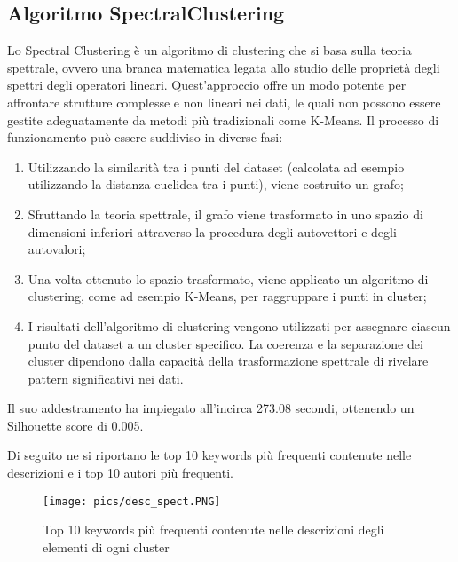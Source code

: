 \documentclass[12pt,oneside]{article}
\begin{document}
    \begin{enumerate}
    \subsection{Algoritmo SpectralClustering}
    \begin{justify}
    Lo Spectral Clustering è un algoritmo di clustering che si basa sulla teoria spettrale, ovvero una branca matematica legata allo studio delle proprietà degli spettri degli operatori lineari. Quest'approccio offre un modo potente per affrontare strutture complesse e non lineari nei dati, le quali non possono essere gestite adeguatamente da metodi più tradizionali come K-Means. 
    Il processo di funzionamento può essere suddiviso in diverse fasi:
    \begin{enumerate}[label=\arabic*)]
        \item Utilizzando la similarità tra i punti del dataset (calcolata ad esempio utilizzando la distanza euclidea tra i punti), viene costruito un grafo;
        \item Sfruttando la teoria spettrale, il grafo viene trasformato in uno spazio di dimensioni inferiori attraverso la procedura degli autovettori e degli autovalori;
        \item Una volta ottenuto lo spazio trasformato, viene applicato un algoritmo di clustering, come ad esempio K-Means, per raggruppare i punti in cluster;
        \item I risultati dell'algoritmo di clustering vengono utilizzati per assegnare ciascun punto del dataset a un cluster specifico. La coerenza e la separazione dei cluster dipendono dalla capacità della trasformazione spettrale di rivelare pattern significativi nei dati.
    \end{enumerate}
    Il suo addestramento ha impiegato all’incirca 273.08 secondi, ottenendo un Silhouette score di 0.005. 
    \end{justify}
    \newpage
    \begin{justify}
    Di seguito ne si riportano le top 10 keywords più frequenti contenute nelle descrizioni e i top 10 autori più frequenti.
    \end{justify}


    \begin{figure}[H]
    \texttt{[image: pics/desc\_spect.PNG]}
    \captionsetup{width=0.90\textwidth, justification=centering}
    \caption{Top 10 keywords più frequenti contenute nelle descrizioni degli elementi di ogni cluster}
    \end{figure}



\end{enumerate}
\end{document}
